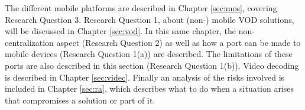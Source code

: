 The different mobile platforms are described in Chapter \ref{sec:mos}, covering Research Question 3. Research Question 1, about (non-) mobile VOD solutions, will be discussed in Chapter \ref{sec:vod}. In this same chapter, the non-centralization aspect (Research Question 2) as well as how a port can be made to mobile devices (Research Question 1(a)) are described. The limitations of these ports are also described in this section (Research Question 1(b)). Video decoding is described in Chapter \ref{sec:videc}. Finally an analysis of the risks involved is included in Chapter \ref{sec:ra}, which describes what to do when a situation arises that compromises a solution or part of it.